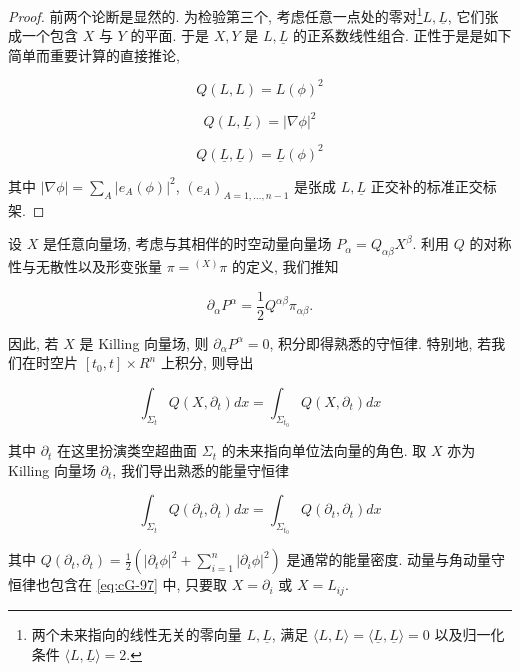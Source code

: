 \begin{proof}
前两个论断是显然的. 为检验第三个, 考虑任意一点处的零对\footnote{两个未来指向的线性无关的零向量 $L,  \underline{L}$, 满足 $\langle L,  L\rangle = \langle \underline{L},  \underline{L}\rangle = 0$ 以及归一化条件 $\langle L,  \underline{L}\rangle = 2$. }$L,  \underline{L}$, 它们张成一个包含 $X$ 与 $Y$ 的平面. 于是 $X,  Y$ 是 $L,  \underline{L}$ 的正系数线性组合. 正性于是是如下简单而重要计算的直接推论, 

\begin{equation}
Q ( L ,  L ) = L ( \phi ) ^ { 2 }\label{eq:cG-94}
\end{equation}

\begin{equation}
Q (L,  \underline {{L}}) = | \nabla \phi | ^ {2}\label{eq:cG-95}
\end{equation}

\begin{equation}
Q (\underline {{L}},  \underline {{L}}) = \underline {L} (\phi) ^ {2}\label{eq:cG-96}
\end{equation}

其中 $|\nabla \phi| = \sum_{A}|e_{A}(\phi)|^{2}$, $(e_A)_{A=1, \dots , n - 1}$ 是张成 $L,  \underline{L}$ 正交补的标准正交标架. 
\end{proof}

设 $X$ 是任意向量场, 考虑与其相伴的时空动量向量场 $P_{\alpha} = Q_{\alpha\beta}X^{\beta}$. 利用 $Q$ 的对称性与无散性以及形变张量 $\pi = {}^{(X)}\pi$ 的定义, 我们推知

\[
\partial_{\alpha}P^{\alpha} = \frac{1}{2}Q^{\alpha\beta}\pi_{\alpha\beta}.
\]

因此, 若 $X$ 是 Killing 向量场, 则 $\partial_{\alpha}P^{\alpha}=0$, 积分即得熟悉的守恒律. 特别地, 若我们在时空片 $[t_{0}, t]\times R^{n}$ 上积分, 则导出

\begin{equation}
\int_{\Sigma_{t}} Q(X,  \partial_{t}) dx = \int_{\Sigma_{t_{0}}} Q(X,  \partial_{t}) dx\label{eq:cG-97}
\end{equation}

其中 $\partial_{t}$ 在这里扮演类空超曲面 $\Sigma_{t}$ 的未来指向单位法向量的角色. 取 $X$ 亦为 Killing 向量场 $\partial_{t}$, 我们导出熟悉的能量守恒律

\[
\int_{\Sigma_{t}} Q(\partial_{t},  \partial_{t}) dx = \int_{\Sigma_{t_{0}}} Q(\partial_{t},  \partial_{t}) dx
\]

其中 $Q(\partial_t,  \partial_t) = \frac{1}{2} \left( |\partial_t \phi|^2 + \sum_{i=1}^{n} |\partial_i \phi|^2 \right)$ 是通常的能量密度. 动量与角动量守恒律也包含在 \eqref{eq:cG-97} 中, 只要取 $X = \partial_i$ 或 $X = L_{ij}$. 

